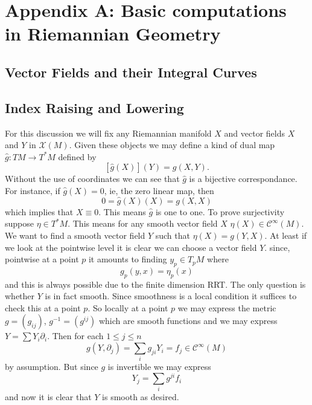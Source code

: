 \section{Appendix A: Basic computations in Riemannian Geometry}

\subsection{Vector Fields and their Integral Curves}

\subsection{Index Raising and Lowering}

For this discussion we will fix any Riemannian manifold $X$ and vector fields $X$ and $Y$ in $\mathcal{X}(M)$. Given these objects we may define a kind of dual map $\hat{g}: TM \to T^*M$ defined by
\[[\hat{g}(X)](Y) = g(X, Y).\] Without the use of coordinates we can see that $\hat{g}$ is a bijective correspondance. For instance, if $\hat{g}(X) = 0$, ie, the zero linear map, then 
\[0 = \hat{g}(X)(X) = g(X, X)\] which implies that $X \equiv 0$. This means $\hat{g}$ is one to one. To prove surjectivity suppose $\eta \in T^*M$. This means for any smooth vector field $X$ $\eta(X) \in \mathcal{C}^\infty(M)$. We want to find a smooth vector field $Y$ such that $\eta(X) = g(Y, X)$. At least if we look at the pointwise level it is clear we can choose a vector field $Y$. since, pointwise at a point $p$ it amounts to finding $y_p \in T_pM$ where
\[g_p(y, x) = \eta_p(x)\]
and this is always possible due to the finite dimension RRT. The only question is whether $Y$ is in fact smooth. Since smoothness is a local condition it suffices to check this at a point $p$. So locally at a point $p$ we may express the metric $g = (g_{ij})$, $g^{-1} = (g^{ij})$ which are smooth functions and we may express $Y = \sum Y_i \partial_i$. Then for each $1 \leq j \leq n$
\[g(Y, \partial_j) = \sum_i g_{ji}Y_i = f_j \in \mathcal{C}^{\infty}(M)\] by assumption. But since $g$ is invertible we may express 
\[Y_j = \sum_{i}g^{ji}f_i\]
and now it is clear that $Y$ is smooth as desired.

